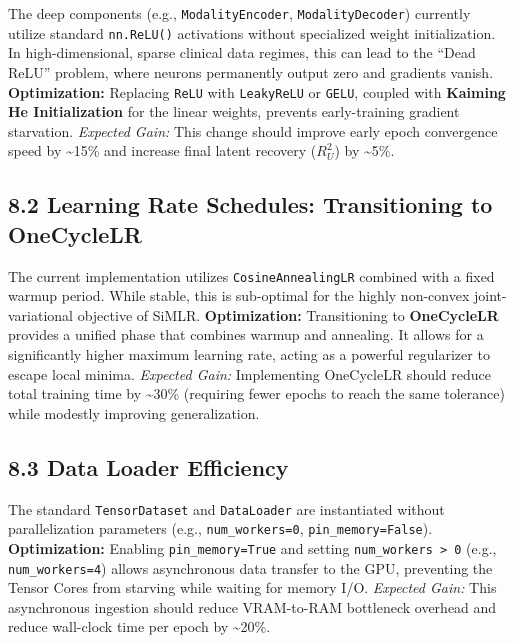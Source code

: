 \documentclass[
  letterpaper,
]{report}
\begin{document}
The deep components (e.g., \texttt{ModalityEncoder},
\texttt{ModalityDecoder}) currently utilize standard \texttt{nn.ReLU()}
activations without specialized weight initialization. In
high-dimensional, sparse clinical data regimes, this can lead to the
``Dead ReLU'' problem, where neurons permanently output zero and
gradients vanish. \textbf{Optimization:} Replacing \texttt{ReLU} with
\texttt{LeakyReLU} or \texttt{GELU}, coupled with \textbf{Kaiming He
Initialization} for the linear weights, prevents early-training gradient
starvation. \emph{Expected Gain:} This change should improve early epoch
convergence speed by \textasciitilde15\% and increase final latent
recovery (\(R^2_U\)) by \textasciitilde5\%.

\subsection{8.2 Learning Rate Schedules: Transitioning to
OneCycleLR}\label{learning-rate-schedules-transitioning-to-onecyclelr}

The current implementation utilizes \texttt{CosineAnnealingLR} combined
with a fixed warmup period. While stable, this is sub-optimal for the
highly non-convex joint-variational objective of SiMLR.
\textbf{Optimization:} Transitioning to \textbf{OneCycleLR} provides a
unified phase that combines warmup and annealing. It allows for a
significantly higher maximum learning rate, acting as a powerful
regularizer to escape local minima. \emph{Expected Gain:} Implementing
OneCycleLR should reduce total training time by \textasciitilde30\%
(requiring fewer epochs to reach the same tolerance) while modestly
improving generalization.

\subsection{8.3 Data Loader Efficiency}\label{data-loader-efficiency}

The standard \texttt{TensorDataset} and \texttt{DataLoader} are
instantiated without parallelization parameters (e.g.,
\texttt{num\_workers=0}, \texttt{pin\_memory=False}).
\textbf{Optimization:} Enabling \texttt{pin\_memory=True} and setting
\texttt{num\_workers\ \textgreater{}\ 0} (e.g., \texttt{num\_workers=4})
allows asynchronous data transfer to the GPU, preventing the Tensor
Cores from starving while waiting for memory I/O. \emph{Expected Gain:}
This asynchronous ingestion should reduce VRAM-to-RAM bottleneck
overhead and reduce wall-clock time per epoch by \textasciitilde20\%.
\end{document}
